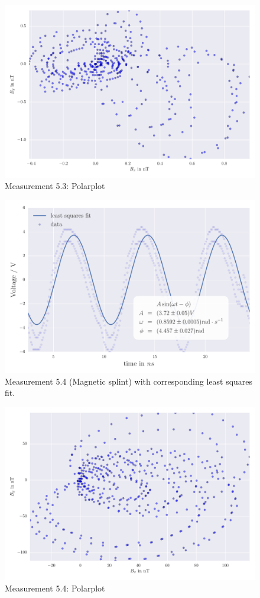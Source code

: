 \begin{figure}[H]
    \centering
    \includegraphics[width=0.7\linewidth]{analysis/figures/polar5_3}
    \caption{Measurement 5.3: Polarplot}
    \label{fig:5_3_polar}
\end{figure}





\begin{figure}[H]
    \centering
    \includegraphics[width=0.7\linewidth]{analysis/figures/fit5_4}
    \caption{Measurement 5.4 (Magnetic splint) with corresponding least squares fit.}
    \label{fig:5_4_plot}
\end{figure}
\begin{figure}[H]
    \centering
    \includegraphics[width=0.7\linewidth]{analysis/figures/polar5_4}
    \caption{Measurement 5.4: Polarplot}
    \label{fig:5_4_polar}
\end{figure}




